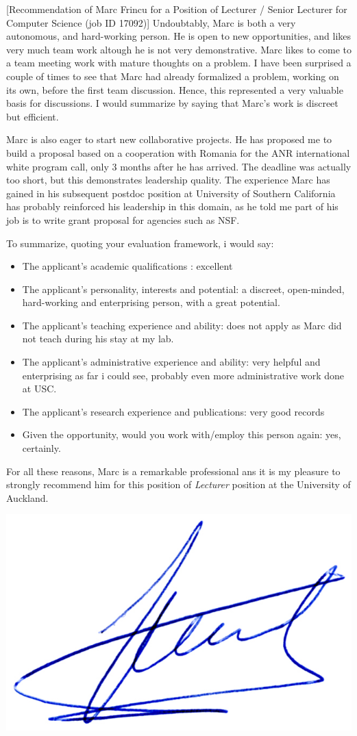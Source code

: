 \documentclass[a4paper,10pt]{article}
\begin{document}
\begin{letter}[Recommendation of Marc Frincu for a Position of Lecturer / Senior Lecturer for Computer Science (job ID 17092)]
Undoubtably, Marc  is both a  very autonomous,  and hard-working person.   He is
open to new opportunities, and likes very  much team work altough he is not very
demonstrative. Marc likes to come to a team meeting work with mature thoughts on
a problem. I have been surprised a couple  of times to see that Marc had already
formalized a  problem, working  on its  own, before  the first  team discussion.
Hence, this represented a very valuable basis for discussions. I would summarize
by saying that Marc's work is discreet but efficient.

Marc is also  eager to start new  collaborative projects. He has  proposed me to
build a proposal  based on a cooperation with Romania  for the ANR international
white  program call,  only 3  months  after he  has arrived.   The deadline  was
actually too  short, but this  demonstrates leadership quality.   The experience
Marc has  gained in his  subsequent postdoc  position at University  of Southern
California has probably reinforced his leadership  in this domain, as he told me
part of his job is to write grant proposal for agencies such as NSF.

\noindent%
To summarize, quoting your evaluation framework, i would say:
\begin{itemize}
\item The applicant's academic qualifications : excellent
\item The applicant's personality, interests and potential: a discreet,
  open-minded, hard-working and enterprising person, with a great potential.
\item The applicant's teaching experience and ability: does not apply as Marc
  did not teach during his stay at my lab.
\item The applicant's administrative experience and ability: very helpful and
  enterprising as far i could see, probably even more administrative work done
  at USC.
\item The applicant's research experience and publications: very good records
\item Given the opportunity, would you work with/employ this person again: yes, certainly.
\end{itemize} 

\medskip
For all these reasons,  Marc is a remarkable professional ans  it is my pleasure
to strongly recommend him for this position of \emph{Lecturer} position at the
University of Auckland.


\end{letter}
\begin{flushright}
\includegraphics[width=.30\textwidth]{signgenaud.jpg}
\end{flushright}
%
%
\end{document}
